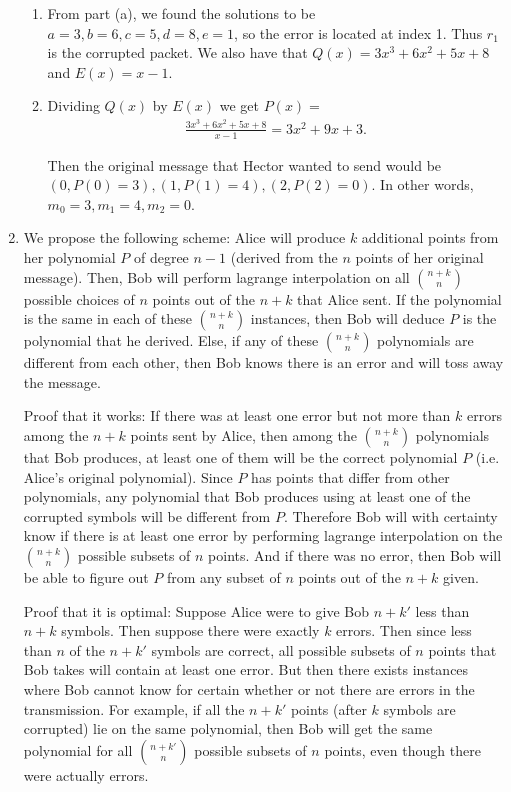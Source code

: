 \begin{enumerate}
\begin{enumerate}
            \item From part (a), we found the solutions to be $a = 3, b = 6, c = 5, d = 8, e = 1$, so the error is located at index 1. Thus $r_1$ is the corrupted packet. We also have that $Q(x) = 3x^3 + 6x^2 + 5x + 8$ and $E(x) = x - 1$.
            
            \item Dividing $Q(x)$ by $E(x)$ we get $P(x) = $
            \begin{align*}
                \frac{3x^3 + 6x^2 + 5x + 8}{x - 1} = 3x^2 + 9x + 3.
            \end{align*}
            
            Then the original message that Hector wanted to send would be $(0, P(0) = 3), (1, P(1) = 4), (2, P(2) = 0)$. In other words, $m_0 = 3, m_1 = 4, m_2 = 0$.
            \end{enumerate}
            
            \item We propose the following scheme: Alice will produce $k$ additional points from her polynomial $P$ of degree $n - 1$ (derived from the $n$ points of her original message). Then, Bob will perform lagrange interpolation on all $\binom{n+k}{n}$ possible choices of $n$ points out of the $n + k$ that Alice sent. If the polynomial is the same in each of these $\binom{n+k}{n}$ instances, then Bob will deduce $P$ is the polynomial that he derived. Else, if any of these $\binom{n+k}{n}$ polynomials are different from each other, then Bob knows there is an error and will toss away the message.
            
            Proof that it works: If there was at least one error but not more than $k$ errors among the $n + k$ points sent by Alice, then among the $\binom{n+k}{n}$ polynomials that Bob produces, at least one of them will be the correct polynomial $P$ (i.e. Alice's original polynomial). Since $P$ has points that differ from other polynomials, any polynomial that Bob produces using at least one of the corrupted symbols will be different from $P$. Therefore Bob will with certainty know if there is at least one error by performing lagrange interpolation on the $\binom{n+k}{n}$ possible subsets of $n$ points. And if there was no error, then Bob will be able to figure out $P$ from any subset of $n$ points out of the $n + k$ given.
            
            Proof that it is optimal: Suppose Alice were to give Bob $n + k'$ less than $n + k$ symbols. Then suppose there were exactly $k$ errors. Then since less than $n$ of the $n + k'$ symbols are correct, all possible subsets of $n$ points that Bob takes will contain at least one error. But then there exists instances where Bob cannot know for certain whether or not there are errors in the transmission. For example, if all the $n + k'$ points (after $k$ symbols are corrupted) lie on the same polynomial, then Bob will get the same polynomial for all $\binom{n+k'}{n}$ possible subsets of $n$ points, even though there were actually errors.
        
        
        
\end{enumerate}